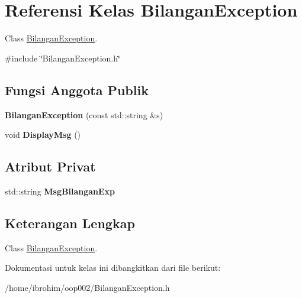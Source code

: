 \hypertarget{classBilanganException}{}\section{Referensi Kelas Bilangan\+Exception}
\label{classBilanganException}


Class \hyperlink{classBilanganException}{Bilangan\+Exception}.  




{\ttfamily \#include \char`\"{}Bilangan\+Exception.\+h\char`\"{}}

\subsection*{Fungsi Anggota Publik}
\begin{DoxyCompactItemize}
\item 
\hypertarget{classBilanganException_a2e445b82800961735dcee2a87cb15f5a}{}{\bfseries Bilangan\+Exception} (const std\+::string \&s)\label{classBilanganException_a2e445b82800961735dcee2a87cb15f5a}

\item 
\hypertarget{classBilanganException_a9f24c7a2b988f6269014f202b7ea2226}{}void {\bfseries Display\+Msg} ()\label{classBilanganException_a9f24c7a2b988f6269014f202b7ea2226}

\end{DoxyCompactItemize}
\subsection*{Atribut Privat}
\begin{DoxyCompactItemize}
\item 
\hypertarget{classBilanganException_a62d376b6c296b8290b49270949805843}{}std\+::string {\bfseries Msg\+Bilangan\+Exp}\label{classBilanganException_a62d376b6c296b8290b49270949805843}

\end{DoxyCompactItemize}


\subsection{Keterangan Lengkap}
Class \hyperlink{classBilanganException}{Bilangan\+Exception}. 

Dokumentasi untuk kelas ini dibangkitkan dari file berikut\+:\begin{DoxyCompactItemize}
\item 
/home/ibrohim/oop002/Bilangan\+Exception.\+h\end{DoxyCompactItemize}
